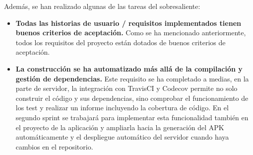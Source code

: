 \documentclass[11pt,a4paper]{report}
\begin{document}
Además, se han realizado algunas de las tareas del sobresaliente:
\begin{itemize}
	\item \textbf{Todas las historias de usuario / requisitos implementados tienen buenos criterios de aceptación.} Como se ha mencionado anteriormente, todos los requisitos del proyecto están dotados de buenos criterios de aceptación.
	\item \textbf{La construcción se ha automatizado más allá de la compilación y gestión de dependencias.} Este requisito se ha completado a medias, en la parte de servidor, la integración con TravisCI y Codecov permite no solo construir el código y sus dependencias, sino comprobar el funcionamiento de los test y realizar un informe incluyendo la cobertura de código. En el segundo sprint se trabajará para implementar esta funcionalidad también en el proyecto de la aplicación y ampliarla hacia la generación del APK automáticamente y el despliegue automático del servidor cuando haya cambios en el repositorio.
\end{itemize}

\end{document}
